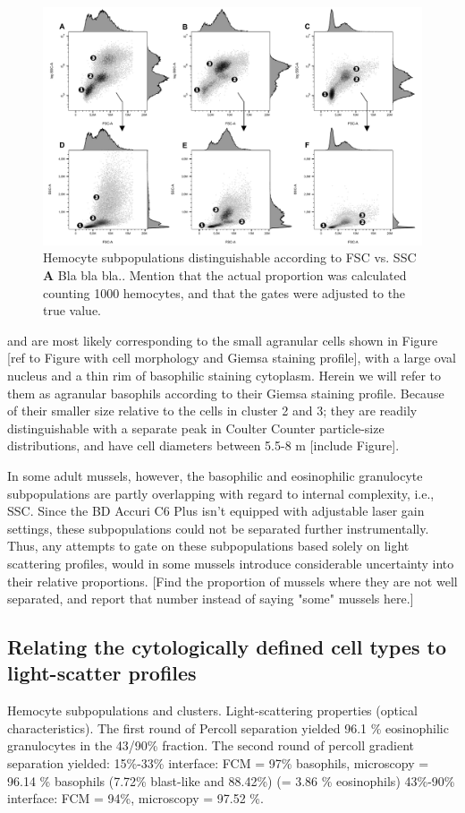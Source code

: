\begin{figure}[!ht]
    \centering
    \includegraphics[width=1.0\textwidth]{figures/Gating strategy/scatter profiles 30k with let num.pdf}
    \caption{Hemocyte subpopulations distinguishable according to FSC vs. SSC \textbf{A} Bla bla bla.. Mention that the actual proportion was calculated counting 1000 hemocytes, and that the gates were adjusted to the true value.}
    \label{fig:fsc_vs_ssc}
\end{figure}

and are most likely corresponding to the small agranular cells shown in Figure [ref to Figure with cell morphology and Giemsa staining profile], with a large oval nucleus and a thin rim of basophilic staining cytoplasm. Herein we will refer to them as agranular basophils according to their Giemsa staining profile. Because of their smaller size relative to the cells in cluster 2 and 3; they are readily distinguishable with a separate peak in Coulter Counter particle-size distributions, and have cell diameters between 5.5-8 \micro m [include Figure].

In some adult mussels, however, the basophilic and eosinophilic granulocyte subpopulations are partly overlapping with regard to internal complexity, i.e., SSC. Since the BD Accuri C6 Plus isn't equipped with adjustable laser gain settings, these subpopulations could not be separated further instrumentally. Thus, any attempts to gate on these subpopulations based solely on light scattering profiles, would in some mussels introduce considerable uncertainty into their relative proportions. [Find the proportion of mussels where they are not well separated, and report that number instead of saying "some" mussels here.]


\subsection{Relating the cytologically defined cell types to light-scatter profiles}
Hemocyte subpopulations and clusters. Light-scattering properties (optical characteristics).
The first round of Percoll separation yielded 96.1 \% eosinophilic granulocytes in the 43/90\% fraction.
The second round of percoll gradient separation yielded: 15\%-33\% interface: FCM = 97\% basophils, microscopy = 96.14 \% basophils (7.72\% blast-like and 88.42\%) (= 3.86 \% eosinophils) 43\%-90\% interface: FCM = 94\%, microscopy = 97.52 \%.

